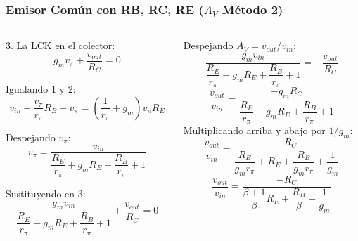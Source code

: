 \begin{frame}[t]
    \frametitle{Emisor Común con RB, RC, RE ($A_V$ Método 2)}

    \begin{columns}
        \begin{column}{0.5\textwidth}
            3. La LCK en el colector:
            \[ g_m v_\pi + \dfrac{v_{out}}{R_C} = 0 \]

            Igualando 1 y 2:
            \[ v_{in} - \dfrac{v_\pi}{r_\pi} R_B - v_\pi = \left( \dfrac{1}{r_\pi} + g_m \right) v_\pi R_E \]

            Despejando $v_\pi$:
            \[ v_\pi = \dfrac{v_{in}}{\dfrac{R_E}{r_\pi} + g_m R_E + \dfrac{R_B}{r_\pi} + 1} \]

            Sustituyendo en 3:
            \[ \dfrac{g_m v_{in}}{\dfrac{R_E}{r_\pi} + g_m R_E + \dfrac{R_B}{r_\pi} + 1} + \dfrac{v_{out}}{R_C} = 0 \]
            \end{column}
        \begin{column}{0.5\textwidth}
            Despejando $A_V = v_{out} / v_{in}$:
            \[ \dfrac{g_m v_{in}}{\dfrac{R_E}{r_\pi} + g_m R_E + \dfrac{R_B}{r_\pi}+ 1} = -\dfrac{v_{out}}{R_C} \]
            \[ \dfrac{v_{out}}{v_{in}} = \dfrac{-g_m R_C}{\dfrac{R_E}{r_\pi} + g_m R_E + \dfrac{R_B}{r_\pi} + 1} \]
            Multiplicando arriba y abajo por $1/g_m$:
            \[ \dfrac{v_{out}}{v_{in}} = \dfrac{-R_C}{\dfrac{R_E}{g_m r_\pi} + R_E + \dfrac{R_B}{g_m r_\pi} + \dfrac{1}{g_m}} \]
            \[ \boxed{\dfrac{v_{out}}{v_{in}} = \dfrac{-R_C}{\dfrac{\beta+1}{\beta} R_E + \dfrac{R_B}{\beta} + \dfrac{1}{g_m}}} \]
        \end{column}
    \end{columns}
\end{frame}

